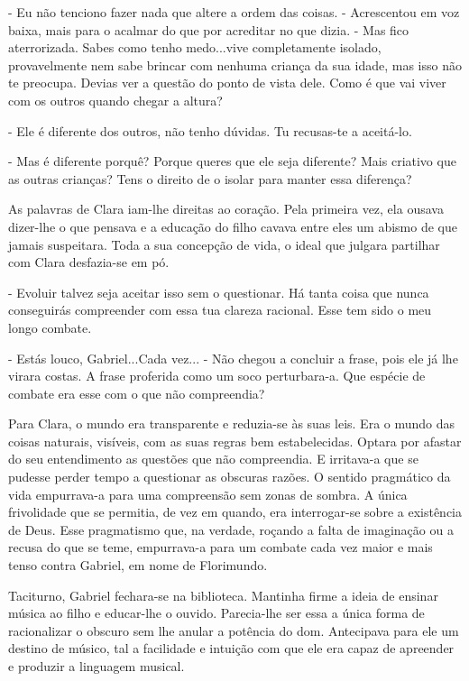 - Eu não tenciono fazer nada que altere a ordem das coisas. -
Acrescentou em voz baixa, mais para o acalmar do que por acreditar no
que dizia. - Mas fico aterrorizada. Sabes como tenho medo...vive
completamente isolado, provavelmente nem sabe brincar com nenhuma
criança da sua idade, mas isso não te preocupa. Devias ver a questão do
ponto de vista dele. Como é que vai viver com os outros quando chegar a
altura?

- Ele é diferente dos outros, não tenho dúvidas. Tu recusas-te a
aceitá-lo.

- Mas é diferente porquê? Porque queres que ele seja diferente? Mais
criativo que as outras crianças? Tens o direito de o isolar para manter
essa diferença?

As palavras de Clara iam-lhe direitas ao coração. Pela primeira vez, ela
ousava dizer-lhe o que pensava e a educação do filho cavava entre eles
um abismo de que jamais suspeitara. Toda a sua concepção de vida, o
ideal que julgara partilhar com Clara desfazia-se em pó.

- Evoluir talvez seja aceitar isso sem o questionar. Há tanta coisa que
nunca conseguirás compreender com essa tua clareza racional. Esse tem
sido o meu longo combate.

- Estás louco, Gabriel...Cada vez... - Não chegou a concluir a frase,
pois ele já lhe virara costas. A frase proferida como um soco
perturbara-a. Que espécie de combate era esse com o que não compreendia?

Para Clara, o mundo era transparente e reduzia-se às suas leis. Era o
mundo das coisas naturais, visíveis, com as suas regras bem
estabelecidas. Optara por afastar do seu entendimento as questões que
não compreendia. E irritava-a que se pudesse perder tempo a questionar
as obscuras razões. O sentido pragmático da vida empurrava-a para uma
compreensão sem zonas de sombra. A única frivolidade que se permitia, de
vez em quando, era interrogar-se sobre a existência de Deus. Esse
pragmatismo que, na verdade, roçando a falta de imaginação ou a recusa
do que se teme, empurrava-a para um combate cada vez maior e mais tenso
contra Gabriel, em nome de Florimundo.

Taciturno, Gabriel fechara-se na biblioteca. Mantinha firme a ideia de
ensinar música ao filho e educar-lhe o ouvido. Parecia-lhe ser essa a
única forma de racionalizar o obscuro sem lhe anular a potência do dom.
Antecipava para ele um destino de músico, tal a facilidade e intuição
com que ele era capaz de apreender e produzir a linguagem musical.


